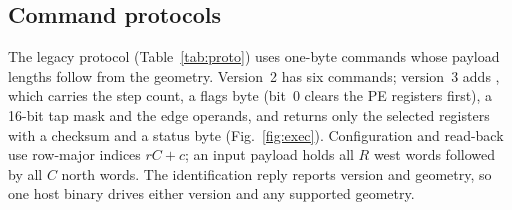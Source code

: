 \subsection{Command protocols}

The legacy protocol (Table~\ref{tab:proto}) uses one-byte commands whose
payload lengths follow from the geometry. Version~2 has six commands;
version~3 adds , which carries the step count, a flags byte (bit~0
clears the PE registers first), a 16-bit tap mask and the edge operands, and
returns only the selected registers with a checksum and a status byte
(Fig.~\ref{fig:exec}). Configuration and read-back use row-major indices
$rC+c$; an input payload holds all $R$ west words followed by all $C$ north
words. The identification reply reports version and geometry, so one host
binary drives either version and any supported geometry.




